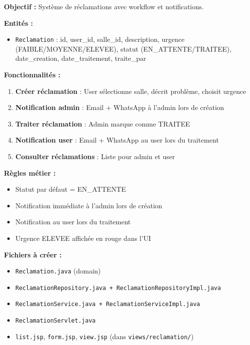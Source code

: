 \documentclass[11pt,a4paper]{article}
\begin{document}
\textbf{Objectif :} Système de réclamations avec workflow et notifications.

\textbf{Entités :}
\begin{itemize}
    \item \texttt{Reclamation} : id, user\_id, salle\_id, description, urgence (FAIBLE/MOYENNE/ELEVEE), statut (EN\_ATTENTE/TRAITEE), date\_creation, date\_traitement, traite\_par
\end{itemize}

\textbf{Fonctionnalités :}
\begin{enumerate}
    \item \textbf{Créer réclamation} : User sélectionne salle, décrit problème, choisit urgence
    \item \textbf{Notification admin} : Email + WhatsApp à l'admin lors de création
    \item \textbf{Traiter réclamation} : Admin marque comme TRAITEE
    \item \textbf{Notification user} : Email + WhatsApp au user lors du traitement
    \item \textbf{Consulter réclamations} : Liste pour admin et user
\end{enumerate}

\textbf{Règles métier :}
\begin{itemize}
    \item Statut par défaut = EN\_ATTENTE
    \item Notification immédiate à l'admin lors de création
    \item Notification au user lors du traitement
    \item Urgence ELEVEE affichée en rouge dans l'UI
\end{itemize}

\textbf{Fichiers à créer :}
\begin{itemize}
    \item \texttt{Reclamation.java} (domain)
    \item \texttt{ReclamationRepository.java + ReclamationRepositoryImpl.java}
    \item \texttt{ReclamationService.java + ReclamationServiceImpl.java}
    \item \texttt{ReclamationServlet.java}
    \item \texttt{list.jsp}, \texttt{form.jsp}, \texttt{view.jsp} (dans \texttt{views/reclamation/})
\end{itemize}

\newpage
\end{document}
